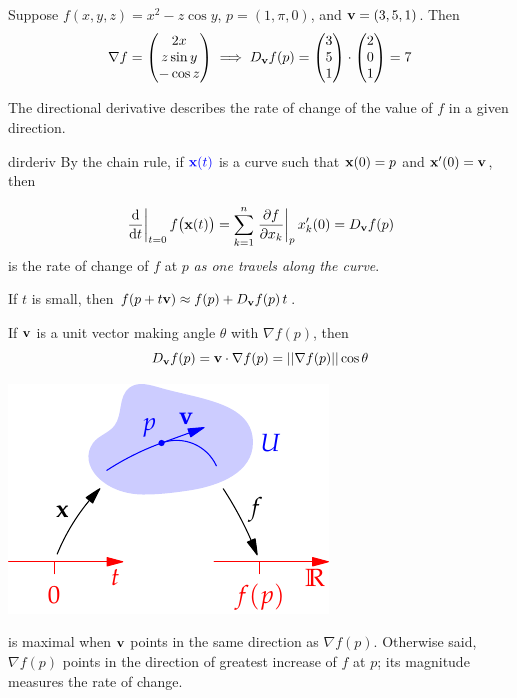 \begin{example}{}{}
	Suppose $f(x,y,z)=x^2-z\cos y$, $p=(1,\pi,0)$, and ${\mathbf{v}}=(3,5,1)$. Then
	\[
		\nabla f=\begin{pmatrix}2x\\z\sin y\\-\cos z\end{pmatrix} \implies D_{\mathbf{v}} f(p)=\begin{pmatrix}3\\5\\1\end{pmatrix}\cdot\begin{pmatrix}2\\0\\1\end{pmatrix} =7
	\]
\end{example}

The directional derivative describes the rate of change of the value of $f$ in a given direction.

\begin{lemm}{}{dirderiv}
\exstart By the chain rule, if $\textcolor{blue}{{\mathbf{x}}(t)}$ is a curve such that ${\mathbf{x}}(0)=p$ and ${\mathbf{x}}'(0)={\mathbf{v}}$, then
\begin{enumerate}\setcounter{enumi}{1}
  \begin{minipage}[t]{0.62\linewidth}\vspace{-12pt}
  	\item[]
  \[
  	\diffat t{t=0}f\bigl(\vx(t)\bigr) =\sum_{k=1}^n\partialsat[f]{x_k}{p}x'_k(0) %
  	=D_\vv f(p)
  \]
  is the rate of change of $f$ at $p$ \emph{as one travels along the curve}.
	\item If $t$ is small, then $f(p+t{\mathbf{v}})\approx f(p)+D_{{\mathbf{v}}}f(p)\,t$.
  \item If ${\mathbf{v}}$ is a unit vector making angle $\theta$ with $\nabla f(p)$, then
  \[D_{{\mathbf{v}}}f(p)={\mathbf{v}}\cdot\nabla f(p)=\left| \left| \nabla f(p)\right|\right|\cos\theta\]
  \end{minipage}
  \hfill
  \begin{minipage}[t]{0.35\linewidth}\vspace{-8pt}
  	\flushright\includegraphics{forms-dderiv}
  \end{minipage}
  \medbreak
  is maximal when ${\mathbf{v}}$ points in the same direction as $\nabla f(p)$. Otherwise said, $\nabla f(p)$ points in the direction of greatest increase of $f$ at $p$; its magnitude measures the rate of change.
\end{enumerate}
\end{lemm}


